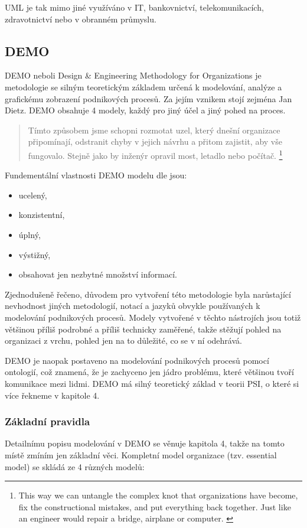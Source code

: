 \documentclass[]{article}
\begin{document}
UML je tak mimo jiné využíváno v IT, bankovnictví, telekomunikacích, zdravotnictví nebo v obranném průmyslu.

\subsection{DEMO}
DEMO neboli Design \& Engineering Methodology for Organizations je metodologie se silným teoretickým základem určená k modelování, analýze a grafickému zobrazení podnikových procesů. Za jejím vznikem stojí zejména Jan Dietz. DEMO obsahuje 4 modely, každý pro jiný účel a jiný pohed na proces.

\begin{quote}
Tímto způsobem jsme schopni rozmotat uzel,  který dnešní organizace připomínají, odstranit chyby v jejich návrhu a přitom zajistit, aby vše fungovalo. Stejně jako by inženýr opravil most, letadlo nebo počítač. \cite{DEMO_web}
\footnote{This way we can untangle the complex knot that organizations have become, fix the constructional mistakes, and put everything back together. Just like an engineer would repair a bridge, airplane or computer. \cite{DEMO_web}}
\end{quote}

Fundementální vlastnosti DEMO modelu dle \cite{Dietz2006} jsou:

\begin{itemize}
\item ucelený,
\item konzistentní,
\item úplný,
\item výstižný,
\item obsahovat jen nezbytné množství informací.
\end{itemize}

Zjednodušeně řečeno, důvodem pro vytvoření této metodologie byla narůstající nevhodnost jiných metodologií, notací a jazyků obvykle používaných k modelování podnikových procesů. %
Modely vytvořené v těchto nástrojích jsou totiž většinou příliš podrobné a příliš technicky zaměřené, takže stěžují pohled na organizaci z vrchu, pohled jen na to důležité, co se v ní odehrává.

DEMO je naopak postaveno na modelování podnikových procesů pomocí ontologií, což znamená, že je zachyceno jen jádro problému, které většinou tvoří komunikace mezi lidmi. DEMO má silný teoretický základ v teorii PSI, o které si více řekneme v kapitole 4. %

\subsubsection{Základní pravidla}
Detailnímu popisu modelování v DEMO se věnuje kapitola 4, takže na tomto místě zmíním jen základní věci. Kompletní model organizace (tzv. essential model) se skládá ze 4 různých modelů: \cite{Vejrazkova2012}
\end{document}
